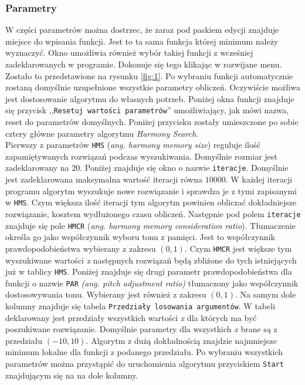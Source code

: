 \documentclass[10pt, a4paper]{article}
\begin{document}
\subsubsection{Parametry}
\label{subsubsec:parametry}
W części parametrów można dostrzec, że zaraz pod paskiem edycji znajduje miejsce do wpisania funkcji. Jest to ta sama funkcja której minimum należy wyznaczyć. Okno umożliwia również wybór takiej funkcji z wcześniej zadeklarowanych w programie. Dokonuje się tego klikając w rozwijane menu. Zostało to przedstawione na rysunku \ref{fig:1}. Po wybraniu funkcji automatycznie zostaną domyślnie uzupełnione wszystkie parametry obliczeń. Oczywiście możliwa jest dostosowanie algorytmu do własnych potrzeb. Poniżej okna funkcji znajduje się przycisk ,,{\tt Resetuj wartości parametrów}'' umożliwiający, jak mówi nazwa, reset do parametrów domyślnych. Poniżej przycisku zostały umieszczone po sobie cztery główne parametry algorytmu {\em Harmony Search}. \\
Pierwszy z parametrów {\tt HMS} ({\em ang. harmony memory size}) reguluje ilość zapamiętywanych rozwiązań podczas wyszukiwania. Domyślnie rozmiar jest zadeklarowany na $20$. Poniżej znajduje się okno o nazwie {\tt iteracje}. Domyślnie jest zadeklarowana maksymalna wartość iteracji równa $10000$. W każdej iteracji programu algorytm wyszukuje nowe rozwiązanie i sprawdza je z tymi zapisanymi w {\tt HMS}. Czym większa ilość iteracji tym algorytm powinien obliczać dokładniejsze rozwiązanie, kosztem wydłużonego czasu obliczeń. Następnie pod polem {\tt iteracje} znajduje się pole {\tt HMCR} ({\em ang. harmony memory consideration ratio}). Tłumaczenie określa go jako współczynnik wyboru tonu z pamięci. Jest to współczynnik prawdopodobieństwa wybierany z zakresu $(0, 1)$. Czym {\tt HMCR} jest większe tym wyszukiwane wartości {\em x} następnych rozwiązań będą zbliżone do tych istniejących już w tablicy {\tt HMS}. Poniżej znajduje się drugi parametr prawdopodobieństwa dla funkcji o nazwie {\tt PAR} {\em(ang. pitch adjustment ratio)} tłumaczony jako współczynnik dostosowywania tonu. Wybierany jest również z zakresu $(0, 1)$. Na samym dole kolumny znajduje się tabela {\tt Przedziały losowania argumentów}. W tabeli deklarowany jest przedziały wszystkich wartości {\em x} dla których ma być poszukiwane rozwiązanie. Domyślnie parametry dla wszystkich {\em x} brane są z przedziału $(-10, 10)$. Algorytm z dużą dokładnością znajdzie najmniejsze minimum lokalne dla funkcji z podanego przedziału. Po wybraniu wszystkich parametrów można przystąpić do uruchomienia algorytmu przyciskiem {\tt Start} znajdującym się na na dole kolumny.
\end{document}
